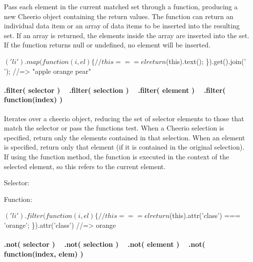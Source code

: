 Pass each element in the current matched set through a function, producing a new Cheerio object containing the return values. The function can return an individual data item or an array of data items to be inserted into the resulting set. If an array is returned, the elements inside the array are inserted into the set. If the function returns null or undefined, no element will be inserted.


\begin{DoxyCode}
$('li').map(function(i, el) \{
  // this === el
  return $(this).text();
\}).get().join(' ');
//=> "apple orange pear"
\end{DoxyCode}


\paragraph*{.filter( selector ) ~\newline
 .filter( selection ) ~\newline
 .filter( element ) ~\newline
 .filter( function(index) )}

Iterates over a cheerio object, reducing the set of selector elements to those that match the selector or pass the function\textquotesingle{}s test. When a Cheerio selection is specified, return only the elements contained in that selection. When an element is specified, return only that element (if it is contained in the original selection). If using the function method, the function is executed in the context of the selected element, so {\ttfamily this} refers to the current element.

Selector\+:




Function\+:


\begin{DoxyCode}
$('li').filter(function(i, el) \{
  // this === el
  return $(this).attr('class') === 'orange';
\}).attr('class')
//=> orange
\end{DoxyCode}


\paragraph*{.not( selector ) ~\newline
 .not( selection ) ~\newline
 .not( element ) ~\newline
 .not( function(index, elem) )}

